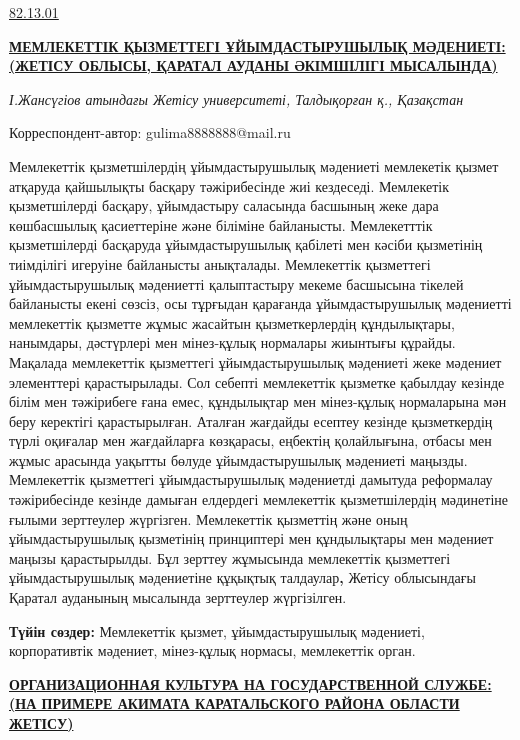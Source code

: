 \href{https://grnti.ru/?p1=82&p2=13&p3=01}{82.13.01}

\href{https://zhetysu.edu.kz/\%D1\%81\%D0\%B5\%D1\%80\%D0\%B8\%D0\%B5\%D0\%B2-\%D0\%B1\%D0\%BE\%D0\%BB\%D0\%B0\%D1\%82-\%D0\%B0\%D0\%B1\%D0\%B4\%D1\%83\%D0\%BB\%D0\%B4\%D0\%B0\%D2\%B1\%D0\%BB\%D1\%8B/}{{\bfseries МЕМЛЕКЕТТІК
ҚЫЗМЕТТЕГІ ҰЙЫМДАСТЫРУШЫЛЫҚ МӘДЕНИЕТІ: (ЖЕТІСУ ОБЛЫСЫ, ҚАРАТАЛ АУДАНЫ
ӘКІМШІЛІГІ МЫСАЛЫНДА)}}


\emph{І.Жансүгіов атындағы Жетісу университеті, Талдықорған қ.,
Қазақстан}

{\bfseries \textsuperscript{\envelope }}Корреспондент-автор: gulima8888888@mail.ru

Мемлекеттік қызметшілердің ұйымдастырушылық мәдениеті мемлекетік қызмет
атқаруда қайшылықты басқару тәжірибесінде жиі кездеседі. Мемлекетік
қызметшілерді басқару, ұйымдастыру саласында басшының жеке дара
көшбасшылық қасиеттеріне және біліміне байланысты. Мемлекетттік
қызметшілерді басқаруда ұйымдастырушылық қабілеті мен кәсіби қызметінің
тиімділігі игеруіне байланысты анықталады. Мемлекеттік қызметтегі
ұйымдастырушылық мәдениетті қалыптастыру мекеме басшысына тікелей
байланысты екені сөзсіз, осы тұрғыдан қарағанда ұйымдастырушылық
мәдениетті мемлекеттік қызметте жұмыс жасайтын қызметкерлердің
құндылықтары, нанымдары, дәстүрлері мен мінез-құлық нормалары жиынтығы
құрайды. Мақалада мемлекеттік қызметтегі ұйымдастырушылық мәдениеті жеке
мәдениет элементтері қарастырылады. Сол себепті мемлекеттік қызметке
қабылдау кезінде білім мен тәжірибеге ғана емес, құндылықтар мен
мінез-құлық нормаларына мән беру керектігі қарастырылған. Аталған
жағдайды есептеу кезінде қызметкердің түрлі оқиғалар мен жағдайларға
көзқарасы, еңбектің қолайлығына, отбасы мен жұмыс арасында уақытты
бөлуде ұйымдастырушылық мәдениеті маңызды. Мемлекеттік қызметтегі
ұйымдастырушылық мәдениетді дамытуда реформалау тәжірибесінде кезінде
дамыған елдердегі мемлекеттік қызметшілердің мәдинетіне ғылыми
зерттеулер жүргізген. Мемлекеттік қызметтің және оның ұйымдастырушылық
қызметінің принциптері мен құндылықтары мен мәдениет маңызы
қарастырылды. Бұл зерттеу жұмысында мемлекеттік қызметтегі
ұйымдастырушылық мәдениетіне құқықтық талдаулар{\bfseries ,} Жетісу
облысындағы Қаратал ауданының мысалында зерттеулер жүргізілген.

{\bfseries Түйін сөздер:} Мемлекеттік қызмет, ұйымдастырушылық мәдениеті,
корпоративтік мәдениет, мінез-құлық нормасы, мемлекеттік орган.

\href{https://zhetysu.edu.kz/\%D1\%81\%D0\%B5\%D1\%80\%D0\%B8\%D0\%B5\%D0\%B2-\%D0\%B1\%D0\%BE\%D0\%BB\%D0\%B0\%D1\%82-\%D0\%B0\%D0\%B1\%D0\%B4\%D1\%83\%D0\%BB\%D0\%B4\%D0\%B0\%D2\%B1\%D0\%BB\%D1\%8B/}{{\bfseries ОРГАНИЗАЦИОННАЯ
КУЛЬТУРА НА ГОСУДАРСТВЕННОЙ СЛУЖБЕ: (НА ПРИМЕРЕ АКИМАТА КАРАТАЛЬСКОГО
РАЙОНА ОБЛАСТИ ЖЕТІСУ)}}

